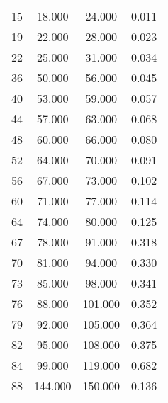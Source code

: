 % 
\begin{tabular}{cccc}
  \hline
  \hline
15 & 18.000 & 24.000 & 0.011 \\ 
  19 & 22.000 & 28.000 & 0.023 \\ 
  22 & 25.000 & 31.000 & 0.034 \\ 
  36 & 50.000 & 56.000 & 0.045 \\ 
  40 & 53.000 & 59.000 & 0.057 \\ 
  44 & 57.000 & 63.000 & 0.068 \\ 
  48 & 60.000 & 66.000 & 0.080 \\ 
  52 & 64.000 & 70.000 & 0.091 \\ 
  56 & 67.000 & 73.000 & 0.102 \\ 
  60 & 71.000 & 77.000 & 0.114 \\ 
  64 & 74.000 & 80.000 & 0.125 \\ 
  67 & 78.000 & 91.000 & 0.318 \\ 
  70 & 81.000 & 94.000 & 0.330 \\ 
  73 & 85.000 & 98.000 & 0.341 \\ 
  76 & 88.000 & 101.000 & 0.352 \\ 
  79 & 92.000 & 105.000 & 0.364 \\ 
  82 & 95.000 & 108.000 & 0.375 \\ 
  84 & 99.000 & 119.000 & 0.682 \\ 
  88 & 144.000 & 150.000 & 0.136 \\ 
   \hline
\end{tabular}
